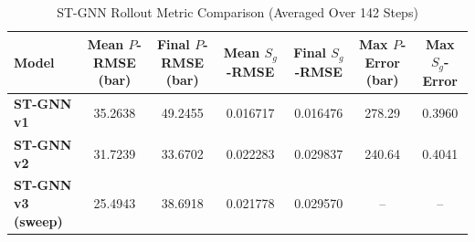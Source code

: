 \begin{table}[h]
\centering
\caption{ST-GNN Rollout Metric Comparison (Averaged Over 142 Steps)}
\label{tab:stgnn_comparison}
\begin{tabular}{lcccccc}
\toprule
\textbf{Model} & \textbf{Mean $P$-RMSE (bar)} & \textbf{Final $P$-RMSE (bar)} & \textbf{Mean $S_g$-RMSE} & \textbf{Final $S_g$-RMSE} & \textbf{Max $P$-Error (bar)} & \textbf{Max $S_g$-Error} \\
\midrule
\textbf{ST-GNN v1} & 35.2638 & 49.2455 & 0.016717 & 0.016476 & 278.29 & 0.3960 \\
\textbf{ST-GNN v2} & 31.7239 & 33.6702 & 0.022283 & 0.029837 & 240.64 & 0.4041 \\
\textbf{ST-GNN v3 (sweep)} & 25.4943 & 38.6918 & 0.021778 & 0.029570 & -- & -- \\
\bottomrule
\end{tabular}
\end{table}
